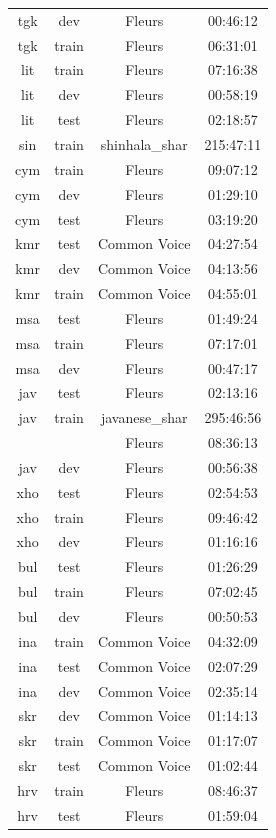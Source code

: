 \begin{longtable}{cccc}
tgk & dev & Fleurs & 00:46:12 \\ 
tgk & train & Fleurs & 06:31:01 \\ \midrule
lit & train & Fleurs & 07:16:38 \\ 
lit & dev & Fleurs & 00:58:19 \\ 
lit & test & Fleurs & 02:18:57 \\ \midrule
sin & train & shinhala_shar & 215:47:11 \\ \midrule
cym & train & Fleurs & 09:07:12 \\ 
cym & dev & Fleurs & 01:29:10 \\ 
cym & test & Fleurs & 03:19:20 \\ \midrule
kmr & test & Common Voice & 04:27:54 \\ 
kmr & dev & Common Voice & 04:13:56 \\ 
kmr & train & Common Voice & 04:55:01 \\ \midrule
msa & test & Fleurs & 01:49:24 \\ 
msa & train & Fleurs & 07:17:01 \\ 
msa & dev & Fleurs & 00:47:17 \\ \midrule
jav & test & Fleurs & 02:13:16 \\ 
jav & train & javanese_shar & 295:46:56 \\ 
 & & Fleurs & 08:36:13 \\ 
jav & dev & Fleurs & 00:56:38 \\ \midrule
xho & test & Fleurs & 02:54:53 \\ 
xho & train & Fleurs & 09:46:42 \\ 
xho & dev & Fleurs & 01:16:16 \\ \midrule
bul & test & Fleurs & 01:26:29 \\ 
bul & train & Fleurs & 07:02:45 \\ 
bul & dev & Fleurs & 00:50:53 \\ \midrule
ina & train & Common Voice & 04:32:09 \\ 
ina & test & Common Voice & 02:07:29 \\ 
ina & dev & Common Voice & 02:35:14 \\ \midrule
skr & dev & Common Voice & 01:14:13 \\ 
skr & train & Common Voice & 01:17:07 \\ 
skr & test & Common Voice & 01:02:44 \\ \midrule
hrv & train & Fleurs & 08:46:37 \\ 
hrv & test & Fleurs & 01:59:04 \\ 

\end{longtable}
